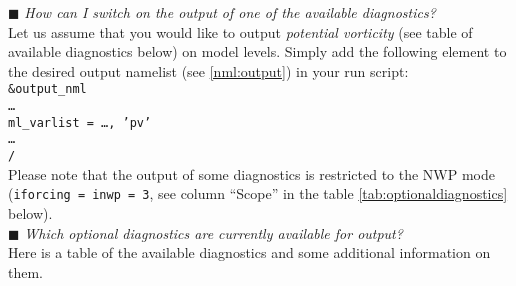 $\blacksquare$ \emph{How can I switch on the output of one of the available diagnostics?} \\

Let us assume that you would like to output \emph{potential vorticity} 
(see table of available diagnostics below) on model levels. 
Simply add the following element to the desired output namelist (see \ref{nml:output}) in your run script: \\
\texttt{\&output\_nml}\\
\texttt{\ldots}\\
\texttt{ml\_varlist = \ldots, 'pv'} \\
\texttt{\ldots}\\
\texttt{/}\\
%
Please note that the output of some diagnostics is restricted to the NWP mode 
(\texttt{iforcing = inwp = 3}, see column ``Scope'' in the table \ref{tab:optionaldiagnostics} below).\\

$\blacksquare$ \emph{Which optional diagnostics are currently available for output?} \\

Here is a table of the available diagnostics and some additional information on them.


